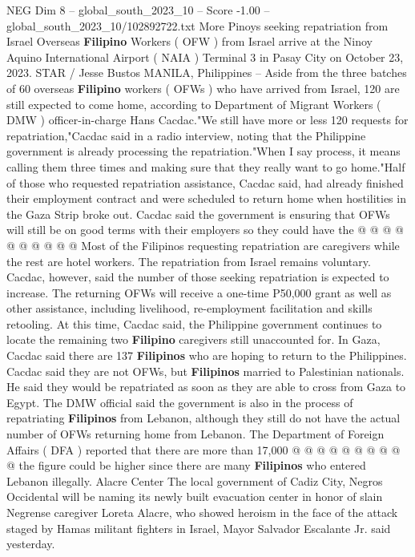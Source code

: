 \begin{textsample}{NEG Dim 8 – global\_south\_2023\_10 – Score -1.00 – global\_south\_2023\_10/102892722.txt}  \label{ex:f8_neg_097}
More Pinoys seeking repatriation from Israel Overseas \textbf{Filipino} Workers ( OFW ) from Israel arrive at the Ninoy Aquino International Airport ( NAIA ) Terminal 3 in Pasay City on October 23, 2023.
STAR / Jesse Bustos MANILA, Philippines -- Aside from the three batches of 60 overseas \textbf{Filipino} workers ( OFWs ) who have arrived from Israel, 120 are still expected to come home, according to Department of Migrant Workers ( DMW ) officer-in-charge Hans Cacdac."We still have more or less 120 requests for repatriation,"Cacdac said in a radio interview, noting that the Philippine government is already processing the repatriation."When I say process, it means calling them three times and making sure that they really want to go home."Half of those who requested repatriation assistance, Cacdac said, had already finished their employment contract and were scheduled to return home when hostilities in the Gaza Strip broke out.
Cacdac said the government is ensuring that OFWs will still be on good terms with their employers so they could have the @ @ @ @ @ @ @ @ @ @ Most of the Filipinos requesting repatriation are caregivers while the rest are hotel workers.
The repatriation from Israel remains voluntary.
Cacdac, however, said the number of those seeking repatriation is expected to increase.
The returning OFWs will receive a one-time P50,000 grant as well as other assistance, including livelihood, re-employment facilitation and skills retooling.
At this time, Cacdac said, the Philippine government continues to locate the remaining two \textbf{Filipino} caregivers still unaccounted for.
In Gaza, Cacdac said there are 137 \textbf{Filipinos} who are hoping to return to the Philippines.
Cacdac said they are not OFWs, but \textbf{Filipinos} married to Palestinian nationals.
He said they would be repatriated as soon as they are able to cross from Gaza to Egypt.
The DMW official said the government is also in the process of repatriating \textbf{Filipinos} from Lebanon, although they still do not have the actual number of OFWs returning home from Lebanon.
The Department of Foreign Affairs ( DFA ) reported that there are more than 17,000 @ @ @ @ @ @ @ @ @ @ the figure could be higher since there are many \textbf{Filipinos} who entered Lebanon illegally.
Alacre Center The local government of Cadiz City, Negros Occidental will be naming its newly built evacuation center in honor of slain Negrense caregiver Loreta Alacre, who showed heroism in the face of the attack staged by Hamas militant fighters in Israel, Mayor Salvador Escalante Jr. said yesterday.

\end{textsample}
